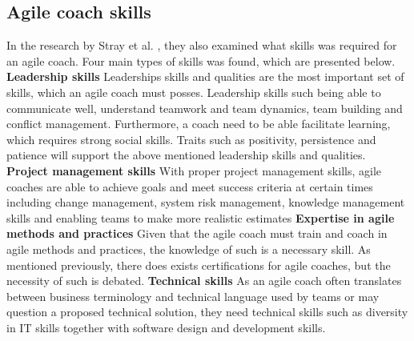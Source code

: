 \documentclass[11pt,a4paper]{report}
\begin{document}
\subsection{Agile coach skills}
In the research by Stray et al. \cite{litReviewACRole}, they also examined what skills was required for an agile coach. Four main types of skills was found, which are presented below.
\newpage
\noindent\textbf{Leadership skills} \newline
Leaderships skills and qualities are the most important set of skills, which an agile coach must posses. Leadership skills such being able to communicate well, understand teamwork and team dynamics, team building and conflict management. Furthermore, a coach need to be able facilitate learning, which requires strong social skills. Traits such as positivity, persistence and patience will support the above mentioned leadership skills and qualities.
\newline
\newline
\noindent\textbf{Project management skills} \newline
With proper project management skills, agile coaches are able to achieve goals and meet success criteria at certain times including change management, system risk management, knowledge management skills and enabling teams to make more realistic estimates
\newline
\newline
\noindent\textbf{Expertise in agile methods and practices} \newline
Given that the agile coach must train and coach in agile methods and practices, the knowledge of such is a necessary skill. As mentioned previously, there does exists certifications for agile coaches, but the necessity of such is debated.
\newline
\newline
\noindent\textbf{Technical skills} \newline
As an agile coach often translates between business terminology and technical language used by teams or may question a proposed technical solution, they need technical skills such as diversity in IT skills together with software design and development skills.
\end{document}
